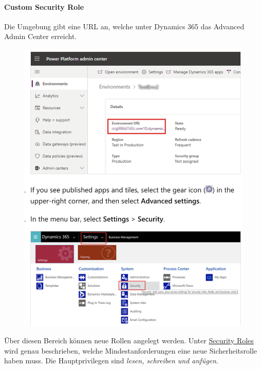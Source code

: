 \paragraph*{Custom Security Role}
Die Umgebung gibt eine URL an, welche unter Dynamics 365 das Advanced Admin Center erreicht.
\begin{figure}[H]
	\centering
	\includegraphics[scale = 0.3]{attachment/chapter_13/Scc016}
\end{figure}
Über diesen Bereich können neue Rollen angelegt werden. Unter \href{https://docs.microsof.com/en-us/power-platform/admin/database-security}{Security Roles} wird genau beschrieben, welche Mindestanforderungen eine neue Sicherheitsrolle haben muss. Die Hauptprivilegen sind \textit{lesen, schreiben und anfügen}.

